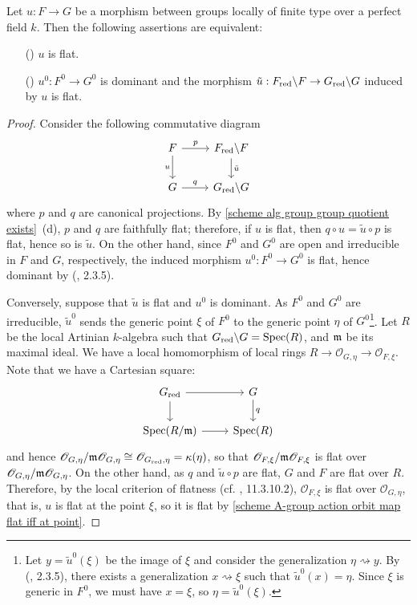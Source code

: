 \begin{proposition}\label{scheme alg group over perfect flat morphism iff G/G_red}
Let $u:F\to G$ be a morphism between groups locally of finite type over a perfect field $k$. Then the following assertions are equivalent:
\begin{enumerate}
    \item[(\rmnum{1})] $u$ is flat.
    \item[(\rmnum{2})] $u^0:F^0\to G^0$ is dominant and the morphism $\tilde{u}:F_{\mathrm{red}}\backslash F\to G_{\mathrm{red}}\backslash G$ induced by $u$ is flat. 
\end{enumerate}
\end{proposition}
\begin{proof}
Consider the following commutative diagram
\[\begin{tikzcd}
F\ar[r,"p"]\ar[d,swap,"u"]&F_\red\backslash F\ar[d,"\tilde{u}"]\\
G\ar[r,"q"]&G_\red\backslash G
\end{tikzcd}\]
where $p$ and $q$ are canonical projections. By \cref{scheme alg group group quotient exists}~(d), $p$ and $q$ are faithfully flat; therefore, if $u$ is flat, then $q\circ u=\tilde{u}\circ p$ is flat, hence so is $\tilde{u}$. On the other hand, since $F^0$ and $G^0$ are open and irreducible in $F$ and $G$, respectively, the induced morphism $u^0:F^0\to G^0$ is flat, hence dominant by (\cite{EGA4-2}, 2.3.5).\par
Conversely, suppose that $\tilde{u}$ is flat and $u^0$ is dominant. As $F^0$ and $G^0$ are irreducible, $\tilde{u}^0$ sends the generic point $\xi$ of $F^0$ to the generic point $\eta$ of $G^0$\footnote{Let $y=\tilde{u}^0(\xi)$ be the image of $\xi$ and consider the generalization $\eta\rightsquigarrow y$. By (\cite{EGA4-2}, 2.3.5), there exists a generalization $x\rightsquigarrow \xi$ such that $\tilde{u}^0(x)=\eta$. Since $\xi$ is generic in $F^0$, we must have $x=\xi$, so $\eta=\tilde{u}^0(\xi)$.}. Let $R$ be the local Artinian $k$-algebra such that $G_{\mathrm{red}}\backslash G=\mathrm{Spec}(R)$, and $\mathfrak{m}$ be its maximal ideal. We have a local homomorphism of local rings $R\to\mathscr{O}_{G,\eta}\to\mathscr{O}_{F,\xi}$. Note that we have a Cartesian square:
\[\begin{tikzcd}
G_\red\ar[d]\ar[r]&G\ar[d,"q"]\\
\Spec(R/\m)\ar[r]&\Spec(R)
\end{tikzcd}\] 
and hence $\mathscr{O}_{G,\eta}/\mathfrak{m}\mathscr{O}_{G,\eta}\cong\mathscr{O}_{G_{\mathrm{red}},\eta}=\kappa(\eta)$, so that $\mathscr{O}_{F,\xi}/\mathfrak{m}\mathscr{O}_{F,\xi}$ is flat over $\mathscr{O}_{G,\eta}/\mathfrak{m}\mathscr{O}_{G,\eta}$. On the other hand, as $q$ and $\tilde{u}\circ p$ are flat, $G$ and $F$ are flat over $R$. Therefore, by the local criterion of flatness (cf. \cite{EGA4-3}, 11.3.10.2), $\mathscr{O}_{F,\xi}$ is flat over $\mathscr{O}_{G,\eta}$, that is, $u$ is flat at the point $\xi$, so it is flat by \cref{scheme A-group action orbit map flat iff at point}.
\end{proof}

